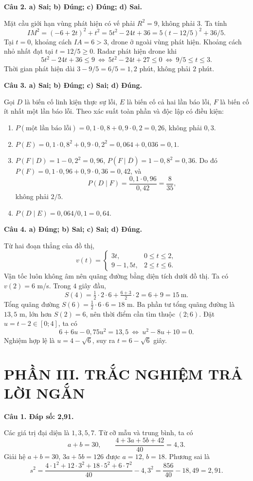 \documentclass[12pt,a4paper]{article}
\newcommand{\loigiai}[1]{\par\medskip\Needspace{4\baselineskip}\noindent\textbf{#1}\par\nobreak}
\begin{document}
\loigiai{Câu 2. a) Sai; b) Đúng; c) Đúng; d) Sai.}
Mặt cầu giới hạn vùng phát hiện có vế phải $R^2=9$, không phải $3$. Ta tính
\[IM^2=(-6+2t)^2+t^2=5t^2-24t+36=5(t-12/5)^2+36/5.\]
Tại $t=0$, khoảng cách $IA=6>3$, drone ở ngoài vùng phát hiện. Khoảng cách nhỏ nhất đạt tại $t=12/5\geq0$. Radar phát hiện drone khi
\[5t^2-24t+36\leq9\ \Longleftrightarrow\ 5t^2-24t+27\leq0\ \Longleftrightarrow\ 9/5\leq t\leq3.\]
Thời gian phát hiện dài $3-9/5=6/5=1{,}2$ phút, không phải $2$ phút.

\loigiai{Câu 3. a) Sai; b) Đúng; c) Sai; d) Đúng.}
Gọi $D$ là biến cố linh kiện thực sự lỗi, $E$ là biến cố cả hai lần báo lỗi, $F$ là biến cố ít nhất một lần báo lỗi. Theo xác suất toàn phần và độc lập có điều kiện:
\begin{enumerate}[label=\alph*),leftmargin=*]
\item $P(\text{một lần báo lỗi})=0{,}1\cdot0{,}8+0{,}9\cdot0{,}2=0{,}26$, không phải $0{,}3$.
\item $P(E)=0{,}1\cdot0{,}8^2+0{,}9\cdot0{,}2^2=0{,}064+0{,}036=0{,}1$.
\item $P(F\mid D)=1-0{,}2^2=0{,}96$, $P(F\mid\overline D)=1-0{,}8^2=0{,}36$. Do đó $P(F)=0{,}1\cdot0{,}96+0{,}9\cdot0{,}36=0{,}42$, và
\[P(D\mid F)=\frac{0{,}1\cdot0{,}96}{0{,}42}=\frac8{35},\]
không phải $2/5$.
\item $P(D\mid E)=0{,}064/0{,}1=0{,}64$.
\end{enumerate}

\loigiai{Câu 4. a) Đúng; b) Sai; c) Sai; d) Đúng.}
Từ hai đoạn thẳng của đồ thị,
\[v(t)=\begin{cases}3t,&0\leq t\leq2,\\9-1{,}5t,&2\leq t\leq6.\end{cases}\]
Vận tốc luôn không âm nên quãng đường bằng diện tích dưới đồ thị. Ta có $v(2)=6$ m/s. Trong $4$ giây đầu,
\[S(4)=\tfrac12\cdot2\cdot6+\tfrac{6+3}{2}\cdot2=6+9=15\ \mathrm m.\]
Tổng quãng đường $S(6)=\tfrac12\cdot6\cdot6=18$ m. Ba phần tư tổng quãng đường là $13{,}5$ m, lớn hơn $S(2)=6$, nên thời điểm cần tìm thuộc $(2;6)$. Đặt $u=t-2\in[0;4]$, ta có
\[6+6u-0{,}75u^2=13{,}5\ \Longleftrightarrow\ u^2-8u+10=0.\]
Nghiệm hợp lệ là $u=4-\sqrt6$, suy ra $t=6-\sqrt6$ giây.

\section*{\large PHẦN III. TRẮC NGHIỆM TRẢ LỜI NGẮN}
\loigiai{Câu 1. Đáp số: 2,91.}
Các giá trị đại diện là $1,3,5,7$. Từ cỡ mẫu và trung bình, ta có
\[a+b=30,\qquad\frac{4+3a+5b+42}{40}=4{,}3.\]
Giải hệ $a+b=30$, $3a+5b=126$ được $a=12$, $b=18$. Phương sai là
\[s^2=\frac{4\cdot1^2+12\cdot3^2+18\cdot5^2+6\cdot7^2}{40}-4{,}3^2
=\frac{856}{40}-18{,}49=2{,}91.\]
\end{document}
